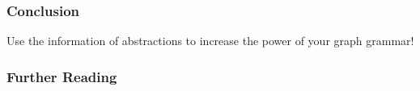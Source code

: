 \documentclass{beamer}
\begin{document}
\begin{frame}
    \frametitle{Conclusion}
        Use the information of abstractions
        to increase the power of your graph grammar!
\end{frame}
\begin{frame}
    \frametitle{Further Reading}

\end{frame}
\end{document}
